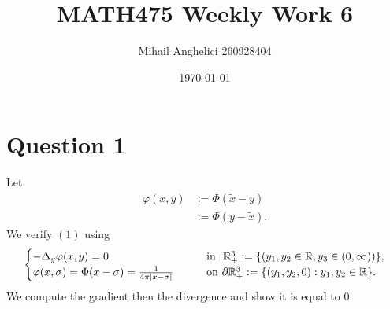 \documentclass[12pt]{article}
\title{MATH475 Weekly Work 6}
\author{Mihail Anghelici 260928404 }
\date{\today}
\theoremstyle{definition}
\theoremstyle{definition}
\theoremstyle{definition}
\theoremstyle{definition}
\theoremstyle{definition}
\theoremstyle{example}
\theoremstyle{note}
\theoremstyle{remark}
\theoremstyle{example}
\begin{document}
	\maketitle
		\section*{Question 1}
			Let 
			\begin{align}
				\varphi(x,y) &:= \Phi(\tilde{x} - y) \\
				&:= \Phi(y-\tilde{x}).
			\end{align}
			We verify $(1)$ using 
			\[ \begin{cases}
				-\Delta_{y}\varphi(x,y) =0 \qquad &\text{in }  \ \mathbb{R}^{3}_{+} := \{(y_{1} , y_{2} \in \mathbb{R} , y_{3} \in (0,\infty))\}, \\
				\varphi(x,\sigma) = \Phi(x-\sigma) = \frac{1}{4\pi \abs{x-\sigma}} \qquad &\text{on} \ \partial\mathbb{R}^{3}_{+} := \{(y_{1} , y_{2} , 0) : y_{1} , y_{2} \in \mathbb{R}\}.
			\end{cases}\]
			We compute the gradient then the divergence and show it is equal to $0$. 
\end{document}

